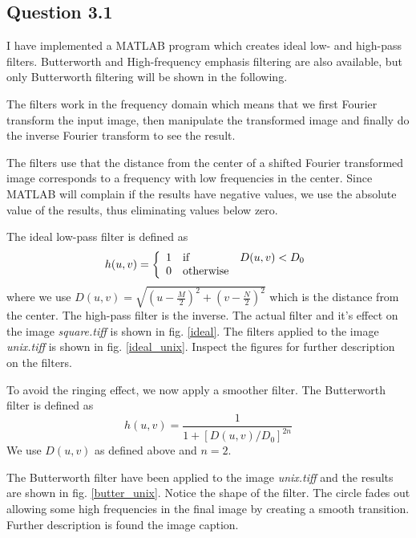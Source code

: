 \documentclass[a4paper, 10pt, final]{article}
\title{\mytitle}
\subtitle{\mysubtitle}
\author{\myauthor{} - \mymail}
\date{\mydate}
\begin{document}
\maketitle

\subsection*{Question 3.1}
I have implemented a MATLAB program which creates ideal low- and
high-pass filters. Butterworth and High-frequency emphasis filtering are
also available, but only Butterworth filtering will be shown in the
following.

The filters work in the frequency domain which means that we first
Fourier transform the input image, then manipulate the transformed image
and finally do the inverse Fourier transform to see the result.

The filters use that the distance from the center of a shifted Fourier
transformed image corresponds to a frequency with low frequencies in the
center. Since MATLAB will complain if the results have negative values,
we use the absolute value of the results, thus eliminating values below
zero.

The ideal low-pass filter is defined as
\begin{equation}
    h(u, v) = \left\{ \begin{array}{l l l}
        1 & \mbox{if} & D(u, v) < D_0\\
        0 & \mbox{otherwise} &
    \end{array}\right.
\end{equation}
where we use $D(u, v) = \sqrt{ (u - \frac{M}{2})^2 + (v - \frac{N}{2})^2 }$
which is the distance from the center. The high-pass filter is the
inverse. The actual filter and it's effect on the image
\emph{square.tiff} is shown in fig. \ref{ideal}. The filters applied to
the image \emph{unix.tiff} is shown in fig. \ref{ideal_unix}. Inspect
the figures for further description on the filters.

To avoid the ringing effect, we now apply a smoother filter. The
Butterworth filter is defined as
\begin{equation}
    h(u, v) = \frac{1}{1 + \left[ D(u, v)/D_0 \right]^{2n}}
\end{equation}
We use $D(u, v)$ as defined above and $n = 2$.

The Butterworth filter have been applied to the image \emph{unix.tiff}
and the results are shown in fig. \ref{butter_unix}. Notice the shape of
the filter. The circle fades out allowing some high frequencies in the
final image by creating a smooth transition. Further description is
found the image caption.
\end{document}
